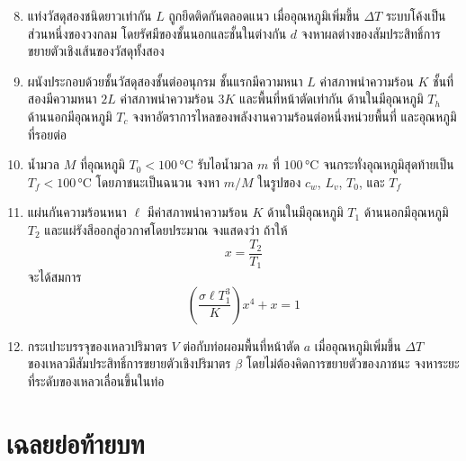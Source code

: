 \begin{enumerate}
    \setcounter{enumi}{7}
    \item แท่งวัสดุสองชนิดยาวเท่ากัน $L$ ถูกยึดติดกันตลอดแนว เมื่ออุณหภูมิเพิ่มขึ้น $\Delta T$ ระบบโค้งเป็นส่วนหนึ่งของวงกลม โดยรัศมีของชั้นนอกและชั้นในต่างกัน $d$ จงหาผลต่างของสัมประสิทธิ์การขยายตัวเชิงเส้นของวัสดุทั้งสอง

    \item ผนังประกอบด้วยชั้นวัสดุสองชั้นต่ออนุกรม ชั้นแรกมีความหนา $L$ ค่าสภาพนำความร้อน $K$ ชั้นที่สองมีความหนา $2L$ ค่าสภาพนำความร้อน $3K$ และพื้นที่หน้าตัดเท่ากัน ด้านในมีอุณหภูมิ $T_h$ ด้านนอกมีอุณหภูมิ $T_c$ จงหาอัตราการไหลของพลังงานความร้อนต่อหนึ่งหน่วยพื้นที่ และอุณหภูมิที่รอยต่อ

    \item น้ำมวล $M$ ที่อุณหภูมิ $T_0<100\,\si{\degreeCelsius}$ รับไอน้ำมวล $m$ ที่ $100\,\si{\degreeCelsius}$ จนกระทั่งอุณหภูมิสุดท้ายเป็น $T_f<100\,\si{\degreeCelsius}$ โดยภาชนะเป็นฉนวน จงหา $m/M$ ในรูปของ $c_w$, $L_v$, $T_0$, และ $T_f$

    \item แผ่นกันความร้อนหนา $\ell$ มีค่าสภาพนำความร้อน $K$ ด้านในมีอุณหภูมิ $T_1$ ด้านนอกมีอุณหภูมิ $T_2$ และแผ่รังสีออกสู่อวกาศโดยประมาณ จงแสดงว่า ถ้าให้
    \[
    x=\frac{T_2}{T_1}
    \]
    จะได้สมการ
    \[
    \left(\frac{\sigma\ell T_1^3}{K}\right)x^4+x=1
    \]

    \item กระเปาะบรรจุของเหลวปริมาตร $V$ ต่อกับท่อผอมพื้นที่หน้าตัด $a$ เมื่ออุณหภูมิเพิ่มขึ้น $\Delta T$ ของเหลวมีสัมประสิทธิ์การขยายตัวเชิงปริมาตร $\beta$ โดยไม่ต้องคิดการขยายตัวของภาชนะ จงหาระยะที่ระดับของเหลวเลื่อนขึ้นในท่อ
\end{enumerate}

\section{เฉลยย่อท้ายบท}

